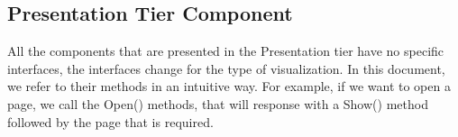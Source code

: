 \documentclass[../../../../dd.tex]{subfiles}
\begin{document}
		\subsection{Presentation Tier Component}
		All the components that are presented in the Presentation tier have no specific interfaces, the interfaces change for the type of visualization. In this document, we refer to their methods in an intuitive way. For example, if we want to open a page, we call the Open() methods, that will response with a Show() method followed by the page that is required.
		
\end{document}
